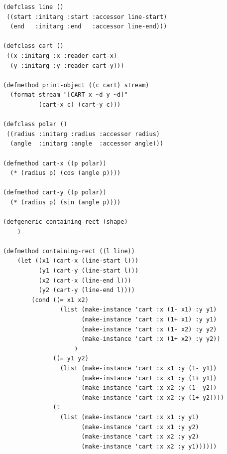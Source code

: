 \documentclass[12pt]{article}
\begin{document}
\begin{lstlisting}
(defclass line ()
 ((start :initarg :start :accessor line-start)
  (end   :initarg :end   :accessor line-end)))

(defclass cart ()
 ((x :initarg :x :reader cart-x)
  (y :initarg :y :reader cart-y)))

(defmethod print-object ((c cart) stream)
  (format stream "[CART x ~d y ~d]"
          (cart-x c) (cart-y c)))
          
(defclass polar ()
 ((radius :initarg :radius :accessor radius)
  (angle  :initarg :angle  :accessor angle)))

(defmethod cart-x ((p polar))
  (* (radius p) (cos (angle p))))

(defmethod cart-y ((p polar))
  (* (radius p) (sin (angle p))))

(defgeneric containing-rect (shape)
    )

(defmethod containing-rect ((l line))
    (let ((x1 (cart-x (line-start l)))
          (y1 (cart-y (line-start l)))  
          (x2 (cart-x (line-end l)))
          (y2 (cart-y (line-end l))))
        (cond ((= x1 x2) 
                (list (make-instance 'cart :x (1- x1) :y y1)
                      (make-instance 'cart :x (1+ x1) :y y1)
                      (make-instance 'cart :x (1- x2) :y y2)
                      (make-instance 'cart :x (1+ x2) :y y2))
                    )
              ((= y1 y2)
                (list (make-instance 'cart :x x1 :y (1- y1))
                      (make-instance 'cart :x x1 :y (1+ y1))
                      (make-instance 'cart :x x2 :y (1- y2))
                      (make-instance 'cart :x x2 :y (1+ y2))))
              (t 
                (list (make-instance 'cart :x x1 :y y1)
                      (make-instance 'cart :x x1 :y y2)
                      (make-instance 'cart :x x2 :y y2)
                      (make-instance 'cart :x x2 :y y1))))))
\end{lstlisting}
\end{document}
